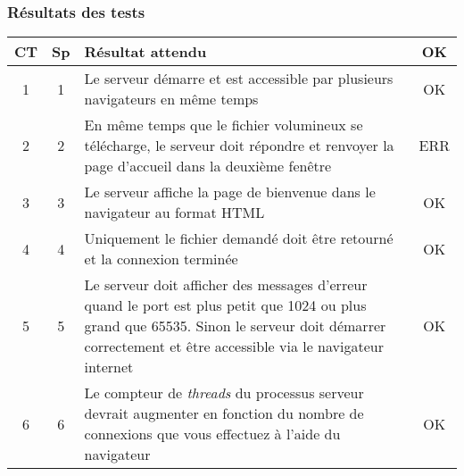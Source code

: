 \documentclass[a4paper, 11pt]{article}
\begin{document}
\subsubsection{Résultats des tests}
\begin{longtable}{ c | c | p{14cm} | c}
CT & Sp & Résultat attendu & OK \\
\hline
\hline
1 & 1 & Le serveur démarre et est accessible par plusieurs navigateurs en même temps & OK \\
\hline
2 & 2 & En même temps que le fichier volumineux se télécharge, le serveur doit répondre et renvoyer la page d'accueil dans la deuxième fenêtre & ERR \\
\hline
3 & 3 & Le serveur affiche la page de bienvenue dans le navigateur au format HTML & OK \\
\hline
4 & 4 & Uniquement le fichier demandé doit être retourné et la connexion terminée & OK \\
\hline
5 & 5 & Le serveur doit afficher des messages d'erreur quand le port est plus petit que 1024 ou plus grand que 65535. Sinon le serveur doit démarrer correctement et être accessible via le navigateur internet & OK \\
\hline
6 & 6 & Le compteur de \emph{threads} du processus serveur devrait augmenter en fonction du nombre de connexions que vous effectuez à l'aide du navigateur & OK \\


\end{longtable}
\end{document}
